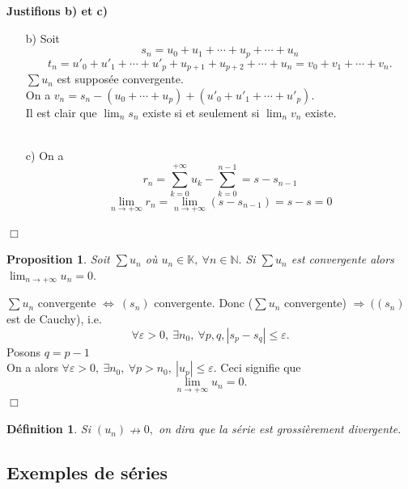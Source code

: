 \documentclass[11pt, a4paper]{book}
\newtheorem{defi}{D\'efinition}[section]
\newtheorem{pro}{Proposition}[section]
\newenvironment{pr}{\noindent {\bf Preuve} \noindent} {\hfill $\Box$\vskip 5mm}
\begin{document}
\begin{pr}\quad
\textbf{Justifions b) et c)} \\ 
\begin{enumerate}
\item[b)] Soit $$s_{n}=u_{0}+u_{1}+ \cdots +u_{p}+ \cdots +u_{n}$$
$$t_{n}=u'_{0}+u'_{1}+ \cdots +u'_{p}+u_{p+1}+u_{p+2}+ \cdots +u_{n}=v_{0}+v_{1}+ \cdots +v_{n}.$$
$\sum u_{n}$ est suppos\'ee convergente.\\
On a $v_{n}=s_{n}-(u_{0}+ \cdots +u_{p})+(u'_{0}+u'_{1}+ \cdots +u'_{p}).$\\
Il est clair que ${\displaystyle \lim_{n} s_{n}}$ existe si et seulement si ${\displaystyle \lim_{n}v_{n}}$ existe.\\ \\
\item[c)] On a $$r_{n} = \sum_{k=0}^{+\infty}u_{k}-\sum_{k=0}^{n-1} = s-s_{n-1}$$
$$\lim_{n \rightarrow +\infty }r_{n}=\lim_{n \rightarrow +\infty }(s-s_{n-1})=s-s=0$$ \end{enumerate}
\end{pr}
\begin{pro} Soit $\sum u_{n}$ o\`u $u_{n} \in \mathbb{K},~ \forall n \in \mathbb{N}.$ Si $\sum u_{n}$ est convergente alors ${\displaystyle\lim_{n\rightarrow +\infty}u_{n}=0}.$ \end{pro}
\begin{pr}\quad
$\sum u_{n}$ convergente $\Leftrightarrow ~(s_{n})$ convergente. Donc ($\sum u_{n}$ convergente) $ \Rightarrow ~((s_{n})$ est de Cauchy), i.e. $$ \forall \varepsilon > 0, ~ \exists n_{0},~ \forall p, q, |s_{p}-s_{q} | \leq \varepsilon .$$
Posons $q=p-1$\\
On a alors $ \forall \varepsilon >0, ~\exists n_{0},~\forall p>n_{0},~ |u_{p}| \leq \varepsilon.$
Ceci signifie que $$\lim_{n \rightarrow +\infty }u_{n}=0.$$
\end{pr}
\begin{defi} Si $(u_{n})\nrightarrow 0,$ on dira que la s\'erie est grossi\`erement divergente.\end{defi}

\subsection{Exemples de s\'eries}
\end{document}
